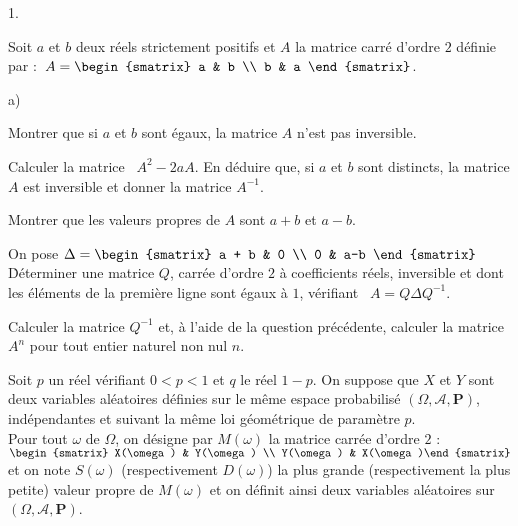 \documentclass[11pt]{article}%
\begin{document}
\begin{noliste}{1.}
 \setlength{\itemsep}{4mm}
\item Soit $a$ et $b$ deux réels strictement positifs et $A$ la matrice
carré d'ordre $2$ définie par :\ $ A = 
\begin{smatrix}
a & b \\
b & a
\end{smatrix}
$.

\begin{noliste}{a)}
 \setlength{\itemsep}{2mm}
\item Montrer que si $a$ et $b$ sont égaux, la matrice $A$ n'est pas
inversible.

\item Calculer la matrice \ $A^{2}-2aA$. En déduire que, si $a$ et $b$
sont distincts, la matrice $A$ est inversible et donner la matrice
$A^{-1}$.

\item Montrer que les valeurs propres de $A$ sont $a + b$ et $a-b$.

\item On pose $ \Delta = 
\begin{smatrix}
a + b & 0 \\
0 & a-b
\end{smatrix}
$\. Déterminer une matrice $Q$, carrée d'ordre $2$ à
coefficients réels, inversible et dont les éléments de la première
ligne sont égaux à $1$, vérifiant \ $A = Q\Delta Q^{-1}$.

\item Calculer la matrice $Q^{-1}$ et, à l'aide de la question
précédente, calculer la matrice $A^{n}$ pour tout entier naturel non
nul $n$.
\end{noliste}

\item Soit $p$ un réel vérifiant $0<p<1$ et $q$ le réel $1-p$.
On suppose que $X$ et $Y$ sont deux variables aléatoires définies
sur le même espace probabilisé $(\Omega,\mathcal{A},\mathbf{P})$,
indépendantes et suivant la même loi géométrique de paramètre $p$.\\
Pour tout $\omega $ de $\Omega $, on désigne par $M(\omega )$ la
matrice
carrée d'ordre $2$ :\ $ 
\begin{smatrix}
X(\omega) & Y(\omega) \\
Y(\omega) & X(\omega)\end{smatrix}
$ et on note $S(\omega )$ (respectivement $D(\omega )$) la plus grande
(respectivement la plus petite) valeur propre de $M(\omega )$ et on
définit ainsi deux variables aléatoires sur
$(\Omega,\mathcal{A},\mathbf{P})$.


\end{noliste}
\end{document}
